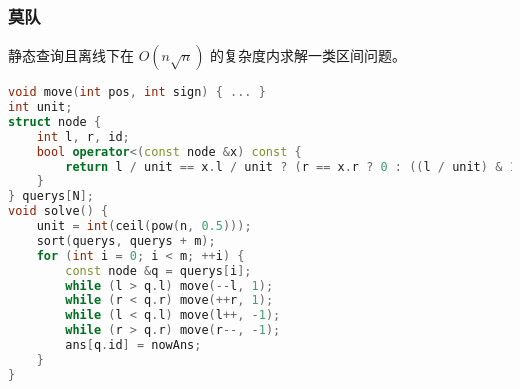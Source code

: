 \documentclass[9pt, a4paper, oneside]{book}
\begin{document}
\subsubsection{莫队}
静态查询且离线下在 $O(n \sqrt n)$ 的复杂度内求解一类区间问题。
\begin{lstlisting}[language={C++}]
void move(int pos, int sign) { ... }
int unit;
struct node {
    int l, r, id;
    bool operator<(const node &x) const {
        return l / unit == x.l / unit ? (r == x.r ? 0 : ((l / unit) & 1) ^ (r < x.r)) : l < x.l;
    }
} querys[N];
void solve() {
    unit = int(ceil(pow(n, 0.5)));
    sort(querys, querys + m);
    for (int i = 0; i < m; ++i) {
        const node &q = querys[i];
        while (l > q.l) move(--l, 1);
        while (r < q.r) move(++r, 1);
        while (l < q.l) move(l++, -1);
        while (r > q.r) move(r--, -1);
        ans[q.id] = nowAns;
    }
}\end{lstlisting}
\end{document}
